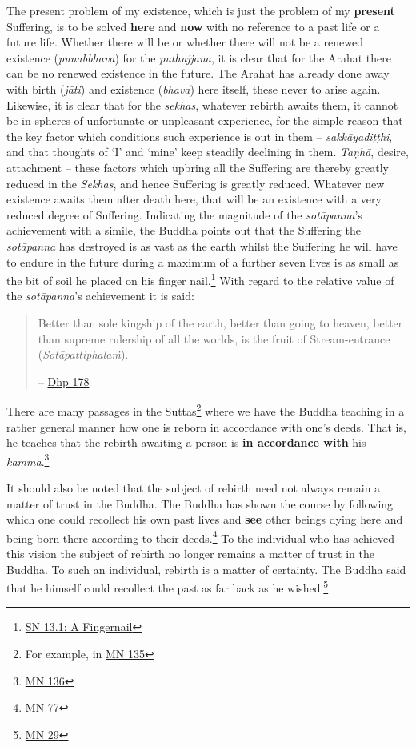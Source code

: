 The present problem of my existence, which is just the problem of my \textbf{present} Suffering, is to be solved \textbf{here} and \textbf{now} with no reference to a past life or a future life. Whether there will be or whether there will not be a renewed existence (\emph{punabbhava}) for the \emph{puthujjana}, it is clear that for the Arahat there can be no renewed existence in the future. The Arahat has already done away with birth (\emph{jāti}) and existence (\emph{bhava}) here itself, these never to arise again. Likewise, it is clear that for the \emph{sekhas}, whatever rebirth awaits them, it cannot be in spheres of unfortunate or unpleasant experience, for the simple reason that the key factor which conditions such experience is out in them -- \emph{sakkāyadiṭṭhi}, and that thoughts of `I' and `mine' keep steadily declining in them. \emph{Taṇhā}, desire, attachment -- these factors which upbring all the Suffering are thereby greatly reduced in the \emph{Sekhas}, and hence Suffering is greatly reduced. Whatever new existence awaits them after death here, that will be an existence with a very reduced degree of Suffering. Indicating the magnitude of the \emph{sotāpanna}'s achievement with a simile, the Buddha points out that the Suffering the \emph{sotāpanna} has destroyed is as vast as the earth whilst the Suffering he will have to endure in the future during a maximum of a further seven lives is as small as the bit of soil he placed on his finger nail.\footnote{\href{https://suttacentral.net/sn13.1/en/sujato}{SN 13.1: A Fingernail}} With regard to the relative value of the \emph{sotāpanna}'s achievement it is said:

\begin{quote}
Better than sole kingship of the earth, better than going to heaven, better than supreme rulership of all the worlds, is the fruit of Stream-entrance (\emph{Sotāpattiphalaṁ}).

 -- \href{https://suttacentral.net/dhp167-178/en/sujato}{Dhp 178}
\end{quote}

There are many passages in the Suttas\footnote{For example, in \href{https://suttacentral.net/mn135/en/bodhi}{MN 135}} where we have the Buddha teaching in a rather general manner how one is reborn in accordance with one's deeds. That is, he teaches that the rebirth awaiting a person is \textbf{in accordance with} his \emph{kamma}.\footnote{\href{https://suttacentral.net/mn136/en/thanissaro}{MN 136}}

It should also be noted that the subject of rebirth need not always remain a matter of trust in the Buddha. The Buddha has shown the course by following which one could recollect his own past lives and \textbf{see} other beings dying here and being born there according to their deeds.\footnote{\href{https://suttacentral.net/mn77/en/bodhi}{MN 77}} To the individual who has achieved this vision the subject of rebirth no longer remains a matter of trust in the Buddha. To such an individual, rebirth is a matter of certainty. The Buddha said that he himself could recollect the past as far back as he wished.\footnote{\href{https://suttacentral.net/mn29/en/bodhi}{MN 29}}

